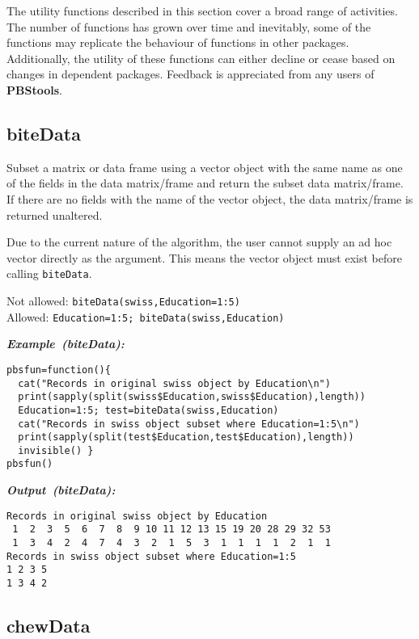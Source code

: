 \documentclass[letterpaper,12pt,fleqn]{article}
\def\tab{\hspace{0.5 in}}
\newcommand{\code}[1]{\small\texttt{#1}\normalsize}
\newcommand{\pkg}[1]{{\bf #1}}
\newcommand\example[1]{    %
	\textbf{\emph{Example~(#1):}}\\ \vspace{3 pt}
}
\newcommand\results[1]{    %
	\textbf{\emph{Output~(#1):}}\\ \vspace{3 pt}
}
\begin{document}
\tab The utility functions described in this section cover a broad range of activities. The number of functions has grown over time and inevitably, some of the functions may replicate the behaviour of functions in other packages. Additionally, the utility of these functions can either decline or cease based on changes in dependent packages. Feedback is appreciated from any users of \pkg{PBStools}.

\subsection {biteData}

\tab Subset a matrix or data frame using a vector object with the same name as one of the fields in the data matrix/frame and return the subset data matrix/frame. If there are no fields with the name of the vector object, the data matrix/frame is returned unaltered.

\tab Due to the current nature of the algorithm, the user cannot supply an ad hoc vector directly as the argument. This means the vector object must exist before calling \code{biteData}.

Not allowed: \code{biteData(swiss,Education=1:5)}\\
Allowed:     \code{Education=1:5; biteData(swiss,Education)}

\begin{examplebox}
\example{biteData}
\begin{Verbatim}[fontsize=\footnotesize]
pbsfun=function(){
  cat("Records in original swiss object by Education\n")
  print(sapply(split(swiss$Education,swiss$Education),length))
  Education=1:5; test=biteData(swiss,Education)
  cat("Records in swiss object subset where Education=1:5\n")
  print(sapply(split(test$Education,test$Education),length))
  invisible() }
pbsfun()
\end{Verbatim}
\end{examplebox}

\begin{outputbox}
\results{biteData}
\begin{Verbatim}[fontsize=\footnotesize]
Records in original swiss object by Education
 1  2  3  5  6  7  8  9 10 11 12 13 15 19 20 28 29 32 53 
 1  3  4  2  4  7  4  3  2  1  5  3  1  1  1  1  2  1  1 
Records in swiss object subset where Education=1:5
1 2 3 5 
1 3 4 2
\end{Verbatim}
\end{outputbox}

\subsection {chewData}
\end{document}
